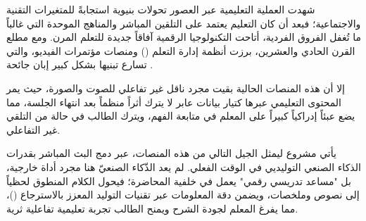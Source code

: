 شهدت العملية التعليمية عبر العصور تحولات بنيوية استجابةً للمتغيرات التقنية والاجتماعية؛ فبعد أن كان التعليم يعتمد على التلقين المباشر والمناهج الموحدة التي غالباً ما تُغفل الفروق الفردية، أتاحت التكنولوجيا الرقمية آفاقاً جديدة للتعلم المرن. ومع مطلع القرن الحادي والعشرين، برزت أنظمة إدارة التعلم () ومنصات مؤتمرات الفيديو، والتي تسارع تبنيها بشكل كبير إبان جائحة .

إلا أن هذه المنصات الحالية بقيت مجرد ناقل غير تفاعلي للصوت والصورة، حيث يمر المحتوى التعليمي عبرها كتيار بيانات عابر لا يترك أثراً منظماً بعد انتهاء الجلسة، مما يضع عبئاً إدراكياً كبيراً على المعلم في متابعة الفهم، ويترك الطالب في حالة من التلقي غير التفاعلي.

يأتي مشروع  ليمثل الجيل التالي من هذه المنصات، عبر دمج البث المباشر بقدرات الذكاء الصنعي التوليديي في الوقت الفعلي. لم يعد الذّكاء الصنعيّ هنا مجرد أداة خارجية، بل "مساعد تدريسي رقمي" يعمل في خلفية المحاضرة؛ فيحول الكلام المنطوق لحظياً إلى نصوص وملخصات، ويضمن دقة المعلومات عبر تقنيات التوليد المعزز بالاسترجاع ()، مما يفرغ المعلم لجودة الشرح ويمنح الطالب تجربة تعليمية تفاعلية ثرية.